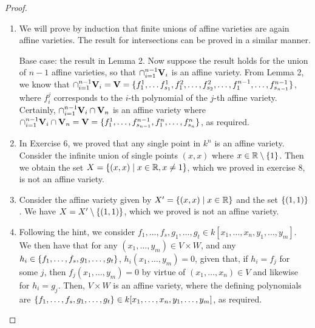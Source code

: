 \begin{proof}
    \begin{enumerate}
        \item We will prove by induction that finite unions of affine varieties are again affine varieties. The result for intersections can be proved in a similar manner. 

        Base case: the result in Lemma 2. Now suppose the result holds for the union of $n-1$ affine varieties, so that $\cap_{i=1}^{n-1}\mathbf{V}_i$ is an affine variety. From Lemma 2, we know that $\cap_{i=1}^{n-1}\mathbf{V}_i= \\\mathbf{V}= {\{f_1^1,\dots f_{s_1}^1,f_1^2,\dots,f_{s_2}^2,\dots,f_1^{n-1},\dots,f_{s_{n-1}}^{n-1}\}}$, where $f_i^j$ corresponds to the $i$-th polynomial of the $j$-th affine variety. Certainly, $\cap_{i=1}^{n-1}\mathbf{V}_i\cap \mathbf{V}_n$ is an affine variety where $\cap_{i=1}^{n-1}\mathbf{V}_i\cap \mathbf{V}_n= \mathbf{V}=\{f_1^1,\dots,f_{s_{n-1}}^{n-1},f_1^n,\dots,f_{s_n}^n\}$, as required.
        \item In Exercise 6, we proved that any single point in $k^n$ is an affine variety. Consider the infinite union of single points $(x,x)$ where $x\in\mathbb{R}\setminus\{1\}$. Then we obtain the set $X=\{(x,x)\mid x\in\mathbb{R},x\neq 1\}$, which we proved in exercise 8, is not an affine variety.
        \item Consider the affine variety given by $X'=\{(x,x)\mid x\in\mathbb{R}\}$ and the set $\{(1,1)\}$. We have $X=X'\setminus\{(1,1)\}$, which we proved is not an affine variety.
        \item Following the hint, we consider $f_1,\dots,f_s,g_1,\dots,g_t\in k[x_1,\dots,x_n,y_1,\dots,y_m]$. We then have that for any $(x_1,\dots,y_m)\in V\times W$, and any $h_i\in\\ \{f_1,\dots,f_s,g_1,\dots,g_t\}$, $h_i(x_1,\dots,y_m)=0$, given that, if $h_i=f_j$ for some $j$, then $f_j(x_1,\dots,y_m)=0$ by virtue of $(x_1,\dots,x_n)\in V$ and likewise for $h_i=g_j$. Then, $V\times W$ is an affine variety, where the defining polynomials are $\{f_1,\dots,f_s,g_1,\dots,g_t\}\in k[x_1,\dots,x_n,y_1,\dots,y_m]$, as required.
    \end{enumerate}
\end{proof}